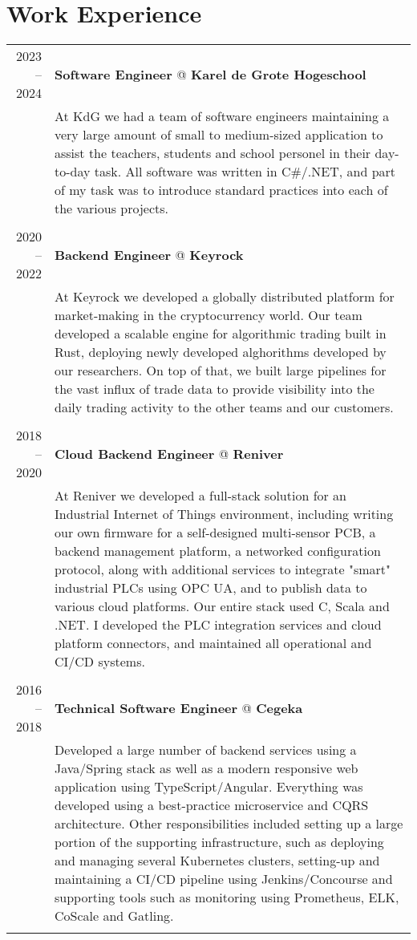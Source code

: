 \documentclass[a4paper,10pt]{article}
\begin{document}
\section{\textcolor{awesome-red}{Wor}k Experience}
	\begin{tabular}{r|p{11cm}}

	\textsc{2023 – 2024} & \textbf{Software Engineer} @ \textbf{Karel de Grote Hogeschool} \\ 
	& \footnotesize{At KdG we had a team of software engineers maintaining a very large amount of small to medium-sized application to assist the teachers, students and school personel in their day-to-day task. All software was written in C\#/.NET, and part of my task was to introduce standard practices into each of the various projects. } \\
	\multicolumn{2}{c}{} \\
	

	\textsc{2020 – 2022} & \textbf{Backend Engineer} @ \textbf{Keyrock} \\ 
	& \footnotesize{At Keyrock we developed a globally distributed platform for market-making in the cryptocurrency world. Our team developed a scalable engine for algorithmic trading built in Rust, deploying newly developed alghorithms developed by our researchers. On top of that, we built large pipelines for the vast influx of trade data to provide visibility into the daily trading activity to the other teams and our customers.} \\
	\multicolumn{2}{c}{} \\
        

	\textsc{2018 – 2020} & \textbf{Cloud Backend Engineer} @ \textbf{Reniver} \\ 
	& \footnotesize{At Reniver we developed a full-stack solution for an Industrial Internet of Things environment, including writing our own firmware for a self-designed multi-sensor PCB, a backend management platform, a networked configuration protocol, along with additional services to integrate "smart" industrial PLCs using OPC UA, and to publish data to various cloud platforms. Our entire stack used C, Scala and .NET. I developed the PLC integration services and cloud platform connectors, and maintained all operational and CI/CD systems.} \\
	\multicolumn{2}{c}{} \\
	
	
	\textsc{2016 – 2018} & \textbf{Technical Software Engineer} @ \textbf{Cegeka} \\ 
	& \footnotesize{Developed a large number of backend services using a Java/Spring stack as well as a modern responsive web application using TypeScript/Angular. Everything was developed using a best-practice microservice and CQRS architecture. Other responsibilities included setting up a large portion of the supporting infrastructure, such as deploying and managing several Kubernetes clusters, setting-up and maintaining a CI/CD pipeline using Jenkins/Concourse and supporting tools such as monitoring using Prometheus, ELK, CoScale and Gatling.} \\
	\multicolumn{2}{c}{} \\


\end{tabular}
\end{document}
